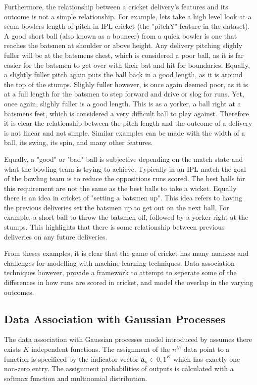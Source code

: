\documentclass[12pt,a4paper]{report}
\theoremstyle{definition}
\begin{document}
Furthermore, the relationship between a cricket delivery's features and its outcome is not a simple relationship. 
For example, lets take a high level look at a seam bowlers length of pitch in IPL cricket (the "pitchY" feature in the dataset).
A good short ball (also known as a bouncer) from a quick bowler is one that reaches the batsmen at shoulder or above height. 
Any delivery pitching slighly fuller will be at the batsmens chest, which is considered a poor ball, as it is far easier for the batsmen to get over with their bat and hit for boundaries.
Equally, a slightly fuller pitch again puts the ball back in a good length, as it is around the top of the stumps. 
Slighly fuller however, is once again deemed poor, as it is at a full length for the batsmen to step forward and drive or slog for runs. 
Yet, once again, slighly fuller is a good length.
This is as a yorker, a ball right at a batsmens feet, which is considered a very difficult ball to play against. 
Therefore it is clear the relationship between the pitch length and the outcome of a delivery is not linear and not simple.
Similar examples can be made with the width of a ball, its swing, its spin, and many other features.

Equally, a "good" or "bad" ball is subjective depending on the match state and what the bowling team is trying to achieve. 
Typically in an IPL match the goal of the bowling team is to reduce the oppositions runs scored. 
The best balls for this requirement are not the same as the best balls to take a wicket. 
Equally there is an idea in cricket of "setting a batsmen up". 
This idea refers to having the previous deliveries set the batsmen up to get out on the next ball. 
For example, a short ball to throw the batsmen off, followed by a yorker right at the stumps. 
This highlights that there is some relationship between previous deliveries on any future deliveries.

From theses examples, it is clear that the game of cricket has many nuances and challenges for modelling with machine learning techniques. 
Data association techniques however, provide a framework to attempt to seperate some of the differences in how runs are scored in cricket, and model the overlap in the varying outcomes.

\subsection{Data Association with Gaussian Processes}

The data association with Gaussian processes model introduced by \citet{Kaiser2018} assumes there exists $K$ independent functions.
The assignment of the $n^{th}$ data point to a function is specificed by the indicator vector $\textbf{a}_{n} \in {0, 1}^K$ which has exactly one non-zero entry.
The assignment probabilities of outputs is calculated with a softmax function and multinomial distribution. 
\end{document}
